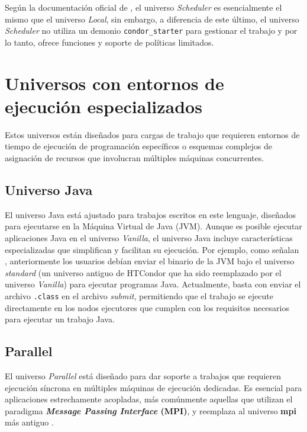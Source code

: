 Según la documentación oficial de \cite{HTCondor-choosing-universe}, el universo \textit{Scheduler} es esencialmente el mismo que el universo \textit{Local}, sin embargo, a diferencia de este último, el universo \textit{Scheduler} no utiliza un demonio \texttt{condor\_starter} para gestionar el trabajo y por lo tanto, ofrece funciones y soporte de políticas limitados.

\section{Universos con entornos de ejecución especializados}

Estos universos están diseñados para cargas de trabajo que requieren entornos de tiempo de ejecución de programación específicos o esquemas complejos de asignación de recursos que involucran múltiples máquinas concurrentes.

\subsection{Universo Java}

El universo Java está ajustado para trabajos escritos en este lenguaje, diseñados para ejecutarse en la Máquina Virtual de Java (JVM). Aunque es posible ejecutar aplicaciones Java en el universo \textit{Vanilla}, el universo Java incluye características especializadas que simplifican y facilitan su ejecución. Por ejemplo, como señalan \cite{Thain2002}, anteriormente los usuarios debían enviar el binario de la JVM bajo el universo \textit{standard} (un universo antiguo de HTCondor que ha sido reemplazado por el universo \textit{Vanilla}) para ejecutar programas Java. Actualmente, basta con enviar el archivo \texttt{.class} en el archivo \textit{submit}, permitiendo que el trabajo se ejecute directamente en los nodos ejecutores que cumplen con los requisitos necesarios para ejecutar un trabajo Java.

\subsection{Parallel}

El universo \textit{Parallel} está diseñado para dar soporte a trabajos que requieren ejecución síncrona en múltiples máquinas de ejecución dedicadas. Es esencial para aplicaciones estrechamente acopladas, más comúnmente aquellas que utilizan el paradigma \textbf{\textit{Message Passing Interface} (MPI)}, y reemplaza al universo \textbf{mpi} más antiguo \citep{HTCondor-env-services}.


